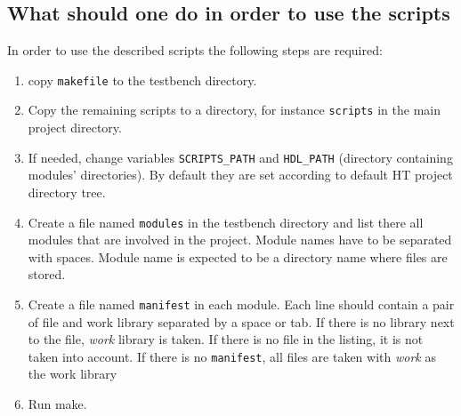 \documentclass[a4paper,10pt]{article}
\begin{document}
\subsection{What should one do in order to use the scripts}
In order to use the described scripts the following steps are required:
\begin{enumerate}
\item copy \verb!makefile! to the testbench directory.
\item Copy the remaining scripts to a directory, for instance \verb!scripts! in the main project directory.
\item If needed, change variables \verb!SCRIPTS_PATH! and \verb!HDL_PATH! (directory containing modules' directories). By default they are set according to default HT project directory tree.

\item Create a file named \verb!modules! in the testbench directory and list there all modules that are involved in the project. Module names have to be separated with spaces. Module name is expected to be a directory name where files are stored.
\item Create a file named \verb!manifest! in each module. Each line should contain a pair of file and work library separated by a space or tab. If there is no library next to the file, \textit{work} library is taken. If there is no file in the listing, it is not taken into account. If there is no \verb!manifest!, all files are taken with \textit{work} as the work library
\item Run make.
\end{enumerate}
\end{document}
